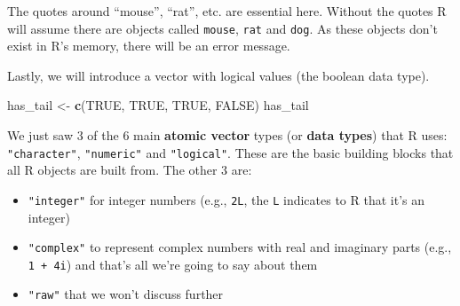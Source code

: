 \documentclass[
]{book}
\newenvironment{Shaded}{\begin{snugshade}}{\end{snugshade}}
\newcommand{\KeywordTok}[1]{\textcolor[rgb]{0.13,0.29,0.53}{\textbf{#1}}}
\newcommand{\NormalTok}[1]{#1}
\newcommand{\OtherTok}[1]{\textcolor[rgb]{0.56,0.35,0.01}{#1}}
\newcommand{\StringTok}[1]{\textcolor[rgb]{0.31,0.60,0.02}{#1}}
\providecommand{\tightlist}{%
  \setlength{\itemsep}{0pt}\setlength{\parskip}{0pt}}
\begin{document}
The quotes around ``mouse'', ``rat'', etc. are essential here. Without the quotes R
will assume there are objects called \texttt{mouse}, \texttt{rat} and \texttt{dog}. As these objects
don't exist in R's memory, there will be an error message.

Lastly, we will introduce a vector with logical values (the boolean data type).

\begin{Shaded}
\begin{Highlighting}[]
\NormalTok{has_tail <-}\StringTok{ }\KeywordTok{c}\NormalTok{(}\OtherTok{TRUE}\NormalTok{, }\OtherTok{TRUE}\NormalTok{, }\OtherTok{TRUE}\NormalTok{, }\OtherTok{FALSE}\NormalTok{)}
\NormalTok{has_tail }
\end{Highlighting}
\end{Shaded}

We just saw 3 of the 6 main \textbf{atomic vector} types (or \textbf{data types}) that R
uses: \texttt{"character"}, \texttt{"numeric"} and \texttt{"logical"}. These are the basic building blocks that all R objects are built from. The other 3 are:

\begin{itemize}
\tightlist
\item
  \texttt{"integer"} for integer numbers (e.g., \texttt{2L}, the \texttt{L} indicates to R that it's an integer)
\item
  \texttt{"complex"} to represent complex numbers with real and imaginary parts (e.g.,
  \texttt{1\ +\ 4i}) and that's all we're going to say about them
\item
  \texttt{"raw"} that we won't discuss further
\end{itemize}
\end{document}
